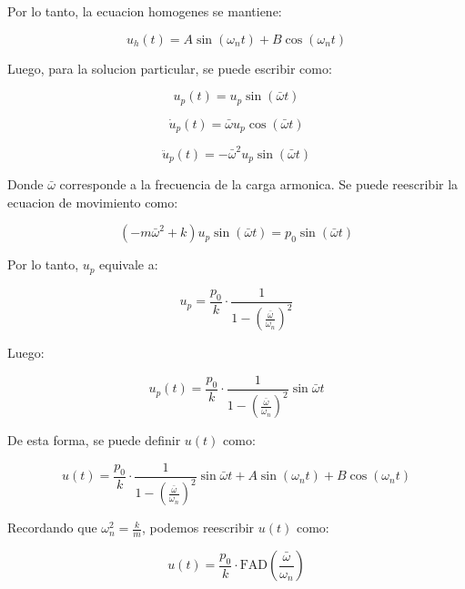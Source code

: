 \documentclass{article}  %
\begin{document}
Por lo tanto, la ecuacion homogenes se mantiene:

\begin{equation}
    u_h(t) = A \sin(\omega_n t) + B \cos(\omega_n t)
\end{equation}

Luego, para la solucion particular, se puede escribir como:

\begin{equation}
    u_p(t) = u_p \sin(\bar{\omega} t )
\end{equation}

\begin{equation}
    \dot{u}_p(t) = \bar{\omega} u_p \cos(\bar{\omega} t )
\end{equation}

\begin{equation}
    \ddot{u}_p(t) = -\bar{\omega}^2 u_p \sin(\bar{\omega} t )
\end{equation}

Donde $\bar{\omega}$ corresponde a la frecuencia de la carga armonica. Se puede reescribir la ecuacion de movimiento como:

\begin{equation}
    (-m \bar{\omega}^2 + k)u_p \sin(\bar{\omega} t ) = p_0 \sin(\bar{\omega} t )
\end{equation}

Por lo tanto, $u_p$ equivale a:

\begin{equation}
    u_p = \frac{p_0}{k} \cdot \frac{1}{1-(\frac{\bar{\omega}}{\omega_n})^2}
\end{equation}

Luego:

\begin{equation}
    u_p(t) = \frac{p_0}{k} \cdot \frac{1}{1-(\frac{\bar{\omega}}{\omega_n})^2} \sin{\bar{\omega} t }
\end{equation}

De esta forma, se puede definir $u(t)$ como:

\begin{equation}
    u(t) = \frac{p_0}{k} \cdot \frac{1}{1-(\frac{\bar{\omega}}{\omega_n})^2} \sin{\bar{\omega} t } + A \sin(\omega_n t) + B \cos(\omega_n t)
\end{equation}

Recordando que $\omega_n^2 = \frac{k}{m}$, podemos reescribir $u(t)$ como:

\begin{equation}
    u(t) = \frac{p_0}{k} \cdot \text{FAD}(\frac{\bar\omega}{\omega_n})
\end{equation}
\end{document}
